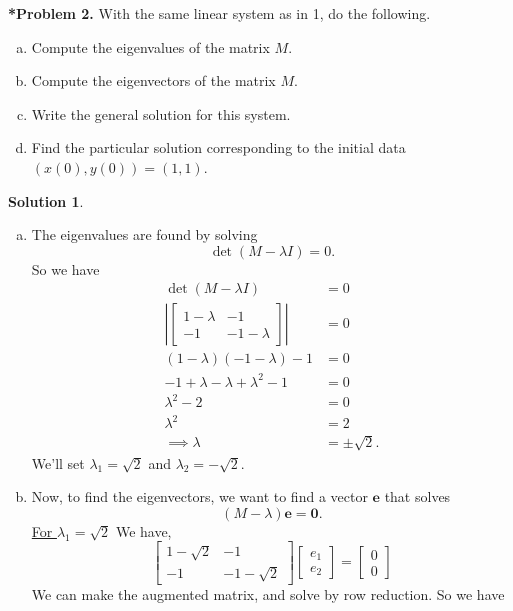 \documentclass[12pt]{report} %
\theoremstyle{definition}
\newtheorem{solution}{Solution}
\begin{document}
\noindent\textbf{*Problem 2.} With the same linear system as in 1, do the following.
\begin{enumerate}[(a)]
    \item Compute the eigenvalues of the matrix $M$.
    \item Compute the eigenvectors of the matrix $M$.
    \item Write the general solution for this system.
    \item Find the particular solution corresponding to the initial data $(x(0),y(0))=(1,1)$.
\end{enumerate}
\begin{solution}~
\begin{enumerate}[(a)]
    \item The eigenvalues are found by solving
    \[
    \det(M-\lambda I)=0.
    \]
    So we have
    \begin{align*}
        \det(M-\lambda I)&=0\\
        \left| \begin{bmatrix} 1-\lambda & -1 \\ -1 & -1-\lambda \end{bmatrix} \right| &= 0\\
        (1-\lambda)(-1-\lambda)-1&=0\\
        -1+\lambda-\lambda + \lambda^2 -1 &=0\\
        \lambda^2 -2 &=0\\
        \lambda^2 &=2\\
        \implies \lambda &= \pm \sqrt{2}.
    \end{align*}
    We'll set $\lambda_1= \sqrt{2}$ and $\lambda_2=-\sqrt{2}$.
    \item Now, to find the eigenvectors, we want to find a vector $\mathbf{e}$ that solves
    \[
    (M-\lambda)\mathbf{e} =\mathbf{0}.
    \]
    \noindent \underline{For $\lambda_1 =\sqrt{2}$}
    We have,
    \[
    \begin{bmatrix} 1-\sqrt{2} & -1 \\ -1 & -1 -\sqrt{2} \end{bmatrix} \begin{bmatrix} e_1 \\ e_2 \end{bmatrix} = \begin{bmatrix} 0 \\ 0 \end{bmatrix}
    \]
    We can make the augmented matrix, and solve by row reduction. So we have
    \begin{align*}

\end{align*}
\end{enumerate}
\end{solution}
\end{document}
